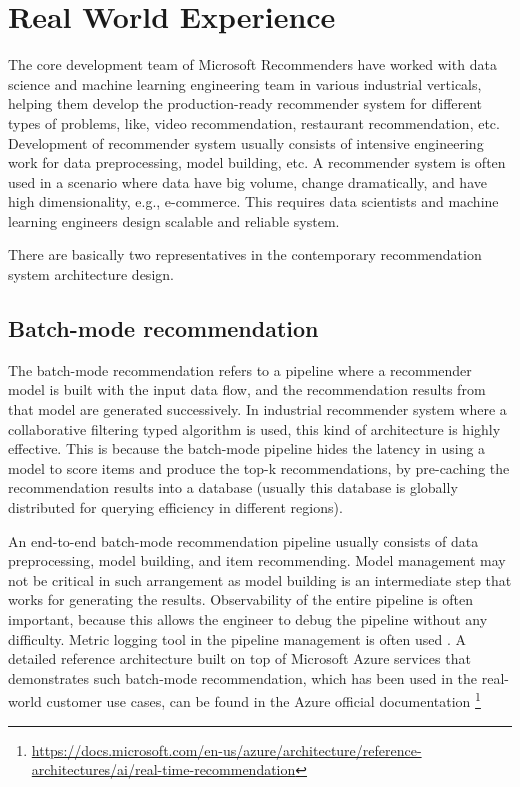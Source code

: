 \section{Real World Experience} 
The core development team of Microsoft Recommenders have worked with data science and machine learning engineering team in various industrial verticals, helping them develop the production-ready recommender system for different types of problems, like, video recommendation, restaurant recommendation, etc. Development of recommender system usually consists of intensive engineering work for data preprocessing, model building, etc. A recommender system is often used in a scenario where data have big volume, change dramatically, and have high dimensionality, e.g., e-commerce. This requires data scientists and machine learning engineers design scalable and reliable system. 

There are basically two representatives in the contemporary recommendation system architecture design.

\subsection{Batch-mode recommendation}
The batch-mode recommendation refers to a pipeline where a recommender model is built with the input data flow, and the recommendation results from that model are generated successively. In industrial recommender system where a collaborative filtering typed algorithm is used, this kind of architecture is highly effective. This is because the batch-mode pipeline hides the latency in using a model to score items and produce the top-k recommendations, by pre-caching the recommendation results into a database (usually this database is globally distributed for querying efficiency in different regions). 

An end-to-end batch-mode recommendation pipeline usually consists of data preprocessing, model building, and item recommending. Model management may not be critical in such arrangement as model building is an intermediate step that works for generating the results. Observability of the entire pipeline is often important, because this allows the engineer to debug the pipeline without any difficulty. Metric logging tool in the pipeline management is often used \cite{zaharia2018accelerating}. A detailed reference architecture built on top of Microsoft Azure services that demonstrates such batch-mode recommendation, which has been used in the real-world customer use cases, can be found in the Azure official documentation \footnote{\url{https://docs.microsoft.com/en-us/azure/architecture/reference-architectures/ai/real-time-recommendation}}

